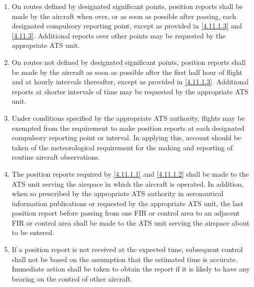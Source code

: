 \documentclass[../vATM.tex]{subfiles}
\begin{document}
    \begin{enumerate}
        \item \label{4.11.1.1} On routes defined by designated significant points, position reports shall be made by the aircraft when over, or as soon as possible after passing, each designated compulsory reporting point, except as provided in \ref{4.11.1.3} and \ref{4.11.3}. Additional reports over other points may be requested by the appropriate ATS unit.
        \item \label{4.11.1.2} On routes not defined by designated significant points, position reports shall be made by the aircraft as soon as possible after the first half hour of flight and at hourly intervals thereafter, except as provided in \ref{4.11.1.3}. Additional reports at shorter intervals of time may be requested by the appropriate ATS unit.
        \item \label{4.11.1.3} Under conditions specified by the appropriate ATS authority, flights may be exempted from the requirement to make position reports at each designated compulsory reporting point or interval. In applying this, account should be taken of the meteorological requirement for the making and reporting of routine aircraft observations.


        \item The position reports required by \ref{4.11.1.1} and \ref{4.11.1.2} shall be made to the ATS unit serving the airspace in which the aircraft is operated. In addition, when so prescribed by the appropriate ATS authority in aeronautical information publications or requested by the appropriate ATS unit, the last position report before passing from one FIR or control area to an adjacent FIR or control area shall be made to the ATS unit serving the airspace about to be entered.
        \item If a position report is not received at the expected time, subsequent control shall not be based on the assumption that the estimated time is accurate. Immediate action shall be taken to obtain the report if it is likely to have any bearing on the control of other aircraft.
    \end{enumerate}
\end{document}
